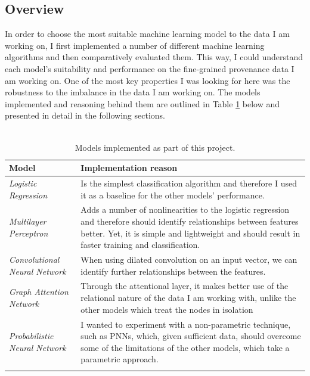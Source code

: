 	\subsection{Overview} \label{Section: impl/ml/overview}
	In order to choose the most suitable machine learning model to the data I am working on, I first implemented a number of different machine learning algorithms and then comparatively evaluated them. This way, I could understand each model's suitability and performance on the fine-grained provenance data I am working on. One of the most key properties I was looking for here was the robustness to the imbalance in the data I am working on. The models implemented and reasoning behind them are outlined in Table \ref{Table: impl/ml/overview/models} below and presented in detail in the following sections.
	\\ \\
	\begin{longtable}{|p{}|p{}|}
		\textbf{Model} & \textbf{Implementation reason} \\
		\hline
		\textit{Logistic Regression} & Is the simplest classification algorithm and therefore I used it as a baseline for the other models' performance. \\
		\hline 
		\textit{Multilayer Perceptron} & Adds a number of nonlinearities to the logistic regression and therefore should identify relationships between features better. Yet, it is simple and lightweight and should result in faster training and classification. \\
		\hline
		\textit{Convolutional Neural Network} & When using dilated convolution on an input vector, we can identify further relationships between the features. \\
		\hline
		\textit{Graph Attention Network} & Through the attentional layer, it makes better use of the relational nature of the data I am working with, unlike the other models which treat the nodes in isolation \\
		\hline
		\textit{Probabilistic Neural Network} & I wanted to experiment with a non-parametric technique, such as PNNs, which, given sufficient data, should overcome some of the limitations of the other models, which take a parametric approach. \\
		\hline
		\caption{Models implemented as part of this project.}
		\label{Table: impl/ml/overview/models}
	\end{longtable}


